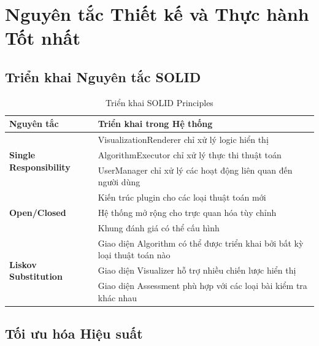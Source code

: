 \section{Nguyên tắc Thiết kế và Thực hành Tốt nhất}
\label{sec:design-principles}

\subsection{Triển khai Nguyên tắc SOLID}

\begin{table}[H]
\centering
\caption{Triển khai SOLID Principles}
\label{tab:solid-principles}
\begin{tabular}{|p{4cm}|p{9cm}|}
\hline
\textbf{Nguyên tắc} & \textbf{Triển khai trong Hệ thống} \\
\hline
\multirow{3}{4cm}{\textbf{Single Responsibility}} 
& VisualizationRenderer chỉ xử lý logic hiển thị \\
\cline{2-2}
& AlgorithmExecutor chỉ xử lý thực thi thuật toán \\
\cline{2-2}
& UserManager chỉ xử lý các hoạt động liên quan đến người dùng \\
\hline
\multirow{3}{4cm}{\textbf{Open/Closed}} 
& Kiến trúc plugin cho các loại thuật toán mới \\
\cline{2-2}
& Hệ thống mở rộng cho trực quan hóa tùy chỉnh \\
\cline{2-2}
& Khung đánh giá có thể cấu hình \\
\hline
\multirow{3}{4cm}{\textbf{Liskov Substitution}} 
& Giao diện Algorithm có thể được triển khai bởi bất kỳ loại thuật toán nào \\
\cline{2-2}
& Giao diện Visualizer hỗ trợ nhiều chiến lược hiển thị \\
\cline{2-2}
& Giao diện Assessment phù hợp với các loại bài kiểm tra khác nhau \\
\hline
\end{tabular}
\end{table}

\subsection{Tối ưu hóa Hiệu suất}

